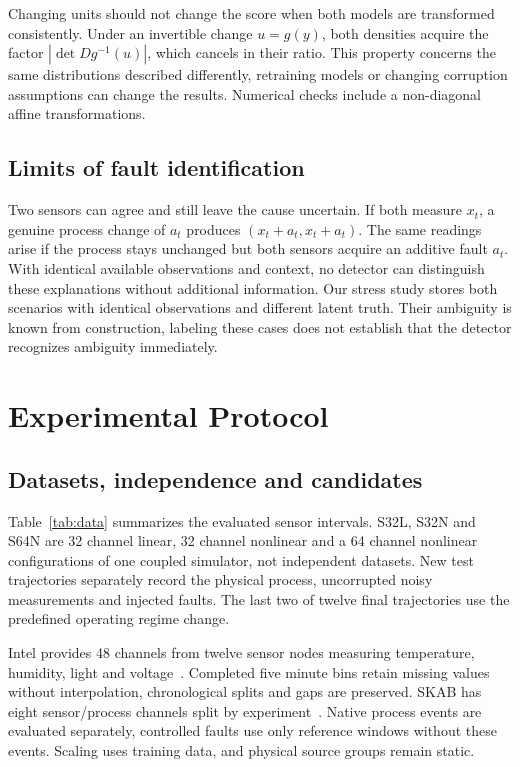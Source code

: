 \documentclass[conference]{IEEEtran}
\newcommand{\1}{\mathbf{1}}
\begin{document}
Changing units should not change the score when both models are transformed consistently. Under an invertible change $u=g(y)$, both densities acquire the factor $|\det Dg^{-1}(u)|$, which cancels in their ratio. This property concerns the same distributions described differently, retraining models or changing corruption assumptions can change the results. Numerical checks include a non-diagonal affine transformations.

\subsection{Limits of fault identification}
Two sensors can agree and still leave the cause uncertain. If both measure $x_t$, a genuine process change of $a_t$ produces $(x_t+a_t,x_t+a_t)$. The same readings arise if the process stays unchanged but both sensors acquire an additive fault $a_t$. With identical available observations and context, no detector can distinguish these explanations without additional information. Our stress study stores both scenarios with identical observations and different latent truth. Their ambiguity is known from construction, labeling these cases does not establish that the detector recognizes ambiguity immediately.







\section{Experimental Protocol}

\subsection{Datasets, independence and candidates}
Table~\ref{tab:data} summarizes the evaluated sensor intervals. S32L, S32N and S64N are 32 channel linear, 32 channel nonlinear and a 64 channel nonlinear configurations of one coupled simulator, not independent datasets. New test trajectories separately record the physical process, uncorrupted noisy measurements and injected faults. The last two of twelve final trajectories use the predefined operating regime change.

Intel provides 48 channels from twelve sensor nodes measuring temperature, humidity, light and voltage~\cite{intel}. Completed five minute bins retain missing values without interpolation, chronological splits and gaps are preserved. SKAB has eight sensor/process channels split by experiment~\cite{skab}. Native process events are evaluated separately, controlled faults use only reference windows without these events. Scaling uses training data, and physical source groups remain static.
\end{document}
